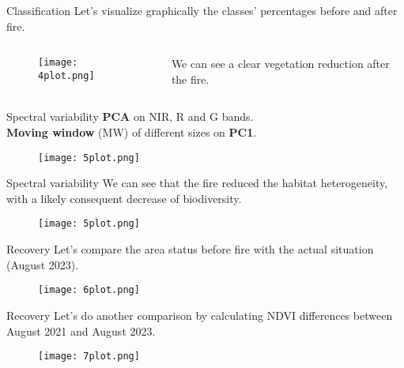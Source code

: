 \documentclass{beamer}
\begin{document}
\begin{frame}{Classification}
\centering
Let's visualize graphically the classes' percentages before and after fire. 
\begin{columns}
    \begin{column}{0.65\textwidth}
    \begin{figure}
        \centering
        \texttt{[image: 4plot.png]} 
    \end{figure}
    \end{column}

    \begin{column}{0.5\textwidth}
        We can see a clear vegetation reduction after the fire. 
    \end{column}
\end{columns}     
\end{frame}

\begin{frame}{Spectral variability}
\centering
\textbf{PCA} on NIR, R and G bands.\\
\textbf{Moving window} (MW) of different sizes on \textbf{PC1}.
\begin{figure}
      \centering
      \texttt{[image: 5plot.png]}
  \end{figure}      
\end{frame}

\begin{frame}{Spectral variability}
\centering
We can see that the fire reduced the habitat heterogeneity,\\ with a likely consequent decrease of biodiversity.  
\begin{figure}
    \centering
    \texttt{[image: 5plot.png]}
\end{figure}
\end{frame}

\begin{frame}{Recovery}
\centering
Let's compare the area status before fire with the actual situation (August 2023). 
\begin{figure}
       \centering
       \texttt{[image: 6plot.png]}
   \end{figure}   
\end{frame}

\begin{frame}{Recovery}
\centering
Let's do another comparison by calculating NDVI differences between August 2021 and August 2023.
\begin{figure}
     \centering
     \texttt{[image: 7plot.png]}
 \end{figure} 
\end{frame}
\end{document}
